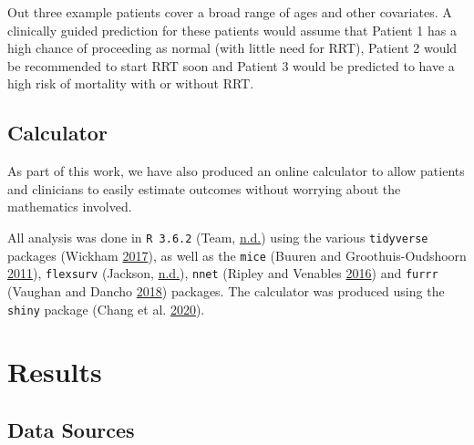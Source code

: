 \documentclass[
]{article}
\begin{document}
Out three example patients cover a broad range of ages and other covariates. A clinically guided prediction for these patients would assume that Patient 1 has a high chance of proceeding as normal (with little need for RRT), Patient 2 would be recommended to start RRT soon and Patient 3 would be predicted to have a high risk of mortality with or without RRT.

\hypertarget{calculator}{%
\subsection{Calculator}\label{calculator}}

As part of this work, we have also produced an online calculator to allow patients and clinicians to easily estimate outcomes without worrying about the mathematics involved.

All analysis was done in \texttt{R\ 3.6.2} (Team, \protect\hyperlink{ref-r_core_team_r_nodate}{n.d.}) using the various \texttt{tidyverse} packages (Wickham \protect\hyperlink{ref-wickham_tidy_2017}{2017}), as well as the \texttt{mice} (Buuren and Groothuis-Oudshoorn \protect\hyperlink{ref-buuren_mice_2011-1}{2011}), \texttt{flexsurv} (Jackson, \protect\hyperlink{ref-jackson_flexsurv_nodate}{n.d.}), \texttt{nnet} (Ripley and Venables \protect\hyperlink{ref-ripley_package_2016}{2016}) and \texttt{furrr} (Vaughan and Dancho \protect\hyperlink{ref-vaughan_furrr_2018}{2018}) packages. The calculator was produced using the \texttt{shiny} package (Chang et al. \protect\hyperlink{ref-chang_shiny_2020}{2020}).

\hypertarget{results-1}{%
\section{Results}\label{results-1}}

\hypertarget{data-sources-1}{%
\subsection{Data Sources}\label{data-sources-1}}
\end{document}
